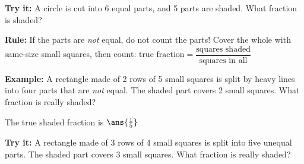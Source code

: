 \documentclass[12pt]{article}
\begin{document}
\begin{tryitbox}
\textbf{Try it:} A circle is cut into 6 equal parts, and 5 parts are shaded.
What fraction is shaded?\\[2pt]
\end{tryitbox}


\begin{formulabox}
\textbf{Rule:} If the parts are \emph{not} equal, do not count the parts!
Cover the whole with same-size small squares, then count:
$\text{true fraction} = \dfrac{\text{squares shaded}}{\text{squares in all}}$
\end{formulabox}

\begin{examplebox}
\textbf{Example:} A rectangle made of 2 rows of 5 small squares is split by
heavy lines into four parts that are \emph{not} equal. The shaded part covers
2 small squares. What fraction is really shaded?

The true shaded fraction is $\ans{\tfrac{1}{5}}$
\end{examplebox}

\begin{tryitbox}
\textbf{Try it:} A rectangle made of 3 rows of 4 small squares is split into
five unequal parts. The shaded part covers 3 small squares. What fraction is
really shaded?\\[2pt]
\end{tryitbox}
\end{document}
